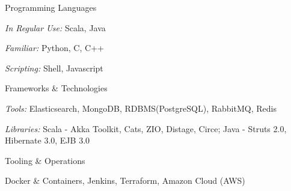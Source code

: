 

\begin{cvskills}

  \cvskill
  {Programming Languages} %
  {
  \begin{cvskillsitems} %
    \item {\emph{In Regular Use:} Scala, Java} %
    \item {\emph{Familiar:} Python, C, C++} %
    \item {\emph{Scripting:} Shell, Javascript} %
  \end{cvskillsitems}
  }

  \cvskill
  {Frameworks \& Technologies} %
  {
  \begin{cvskillsitems} %
    \item {\emph{Tools:} Elasticsearch, MongoDB, RDBMS(PostgreSQL), RabbitMQ, Redis} %
    \item {\emph{Libraries:} Scala - Akka Toolkit, Cats, ZIO, Distage, Circe; Java - Struts 2.0, Hibernate 3.0, EJB 3.0} %
  \end{cvskillsitems}
  }


  \cvskill
  {Tooling \& Operations} %
  {
  \begin{cvskillsitems} %
    \item {Docker \& Containers, Jenkins, Terraform, Amazon Cloud (AWS)} %
  \end{cvskillsitems}
  }

\end{cvskills}

